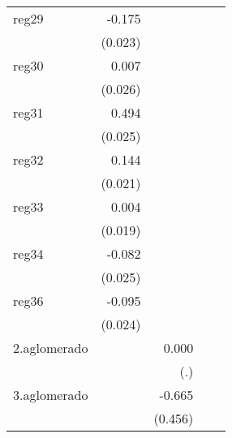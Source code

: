 {\begin{longtable}{l*{4}{D{.}{.}{-1}}}
\addlinespace
reg29       &      -0.175\sym{***}&                     &                     &                     \\
            &     (0.023)         &                     &                     &                     \\
\addlinespace
reg30       &       0.007         &                     &                     &                     \\
            &     (0.026)         &                     &                     &                     \\
\addlinespace
reg31       &       0.494\sym{***}&                     &                     &                     \\
            &     (0.025)         &                     &                     &                     \\
\addlinespace
reg32       &       0.144\sym{***}&                     &                     &                     \\
            &     (0.021)         &                     &                     &                     \\
\addlinespace
reg33       &       0.004         &                     &                     &                     \\
            &     (0.019)         &                     &                     &                     \\
\addlinespace
reg34       &      -0.082\sym{***}&                     &                     &                     \\
            &     (0.025)         &                     &                     &                     \\
\addlinespace
reg36       &      -0.095\sym{***}&                     &                     &                     \\
            &     (0.024)         &                     &                     &                     \\
\addlinespace
2.aglomerado&                     &       0.000         &                     &                     \\
            &                     &         (.)         &                     &                     \\
\addlinespace
3.aglomerado&                     &      -0.665         &                     &                     \\
            &                     &     (0.456)         &                     &                     \\

\end{longtable}}
